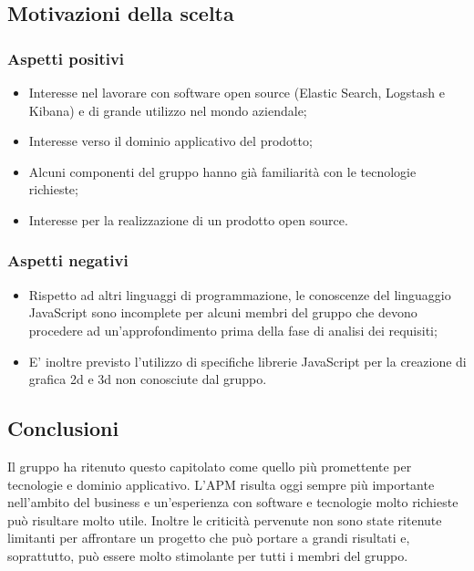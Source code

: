 	\subsection{Motivazioni della scelta}
		\subsubsection{Aspetti positivi}
			\begin{itemize}
				\item Interesse nel lavorare con software open source (Elastic Search, Logstash e Kibana) e di grande utilizzo nel mondo aziendale;
				\item Interesse verso il dominio applicativo del prodotto;
				\item Alcuni componenti del gruppo hanno già familiarità con le tecnologie richieste;
				\item Interesse per la realizzazione di un prodotto open source.
			\end{itemize}
		\subsubsection{Aspetti negativi}
			\begin{itemize}
				\item Rispetto ad altri linguaggi di programmazione, le conoscenze del linguaggio JavaScript sono incomplete per alcuni membri del gruppo che devono procedere ad un'approfondimento prima della fase di analisi dei requisiti;
				\item E' inoltre previsto l'utilizzo di specifiche librerie JavaScript per la creazione di grafica 2d e 3d non conosciute dal gruppo.
			\end{itemize}
	\subsection{Conclusioni}	
	Il gruppo ha ritenuto questo capitolato come quello più promettente per tecnologie e dominio applicativo. L'APM risulta oggi sempre più importante nell'ambito del business e un'esperienza con software e tecnologie molto richieste può risultare molto utile. Inoltre le criticità pervenute non sono state ritenute limitanti per affrontare un progetto che può portare a grandi risultati e, soprattutto, può essere molto stimolante per tutti i membri del gruppo.
			 